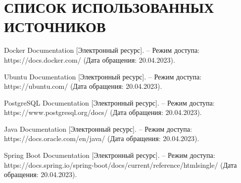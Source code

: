 \section*{СПИСОК ИСПОЛЬЗОВАННЫХ ИСТОЧНИКОВ}

\begingroup
\renewcommand{\section}[2]{}
\begin{thebibliography}{}
	 Docker Documentation [Электронный ресурс]. -- Режим доступа: https://docs.docker.com/ (Дата обращения: 20.04.2023).
	
	 Ubuntu Documentation [Электронный ресурс]. -- Режим доступа: https://ubuntu.com/ (Дата обращения: 20.04.2023).
	
	 PostgreSQL Documentation [Электронный ресурс]. -- Режим доступа: https://www.postgresql.org/docs/ (Дата обращения: 20.04.2023).
	
	 Java Documentation [Электронный ресурс]. -- Режим доступа: https://docs.oracle.com/en/java/ (Дата обращения: 20.04.2023).
	
	 Spring Boot Documentation [Электронный ресурс]. -- Режим доступа: https://docs.spring.io/spring-boot/docs/current/reference/htmlsingle/ (Дата обращения: 20.04.2023).
	
\end{thebibliography}
\endgroup

\pagebreak